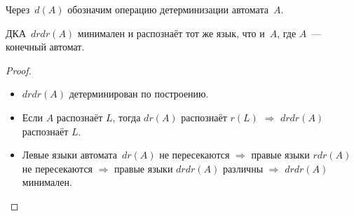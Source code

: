 Через~$d(A)$ обозначим операцию детерминизации автомата~$A$.

\begin{theorem}[Бржозовского]
ДКА~$drdr(A)$ минимален и распознаёт тот же язык, что и~$A$, где $A$~--- конечный автомат.
\end{theorem}
\begin{proof}
\begin{itemize}
	\item $drdr(A)$ детерминирован по построению.
	\item Если $A$ распознаёт $L$, тогда $dr(A)$ распознаёт $r(L)$ $\Rightarrow$ $drdr(A)$ распознаёт $L$.
	\item Левые языки автомата~$dr(A)$ не пересекаются $\Rightarrow$ правые языки $rdr(A)$ не пересекаются $\Rightarrow$ правые языки $drdr(A)$ различны $\Rightarrow$ $drdr(A)$ минимален.
\end{itemize}
\end{proof}